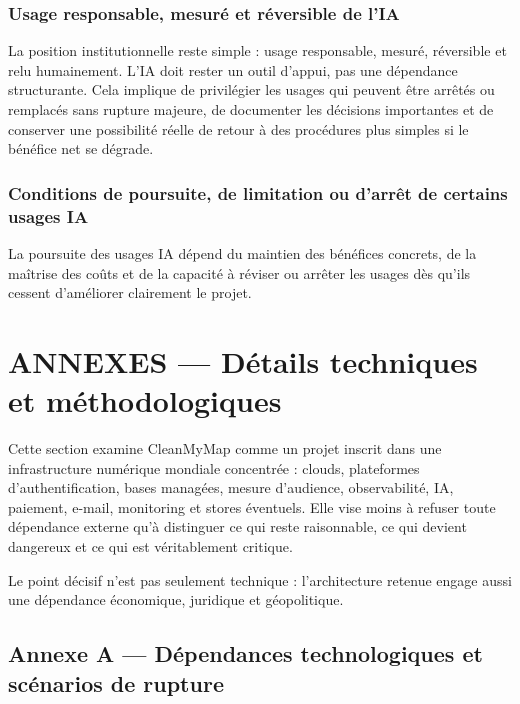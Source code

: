 \documentclass[
  10pt,
  a4paper,
  DIV=11,
  numbers=noendperiod,
  oneside]{scrreprt}
\begin{document}
\subsection{Usage responsable, mesuré et réversible de
l'IA}\label{usage-responsable-mesuruxe9-et-ruxe9versible-de-lia}

La position institutionnelle reste simple : usage responsable, mesuré,
réversible et relu humainement. L'IA doit rester un outil d'appui, pas
une dépendance structurante. Cela implique de privilégier les usages qui
peuvent être arrêtés ou remplacés sans rupture majeure, de documenter
les décisions importantes et de conserver une possibilité réelle de
retour à des procédures plus simples si le bénéfice net se dégrade.

\subsection{Conditions de poursuite, de limitation ou d'arrêt de
certains usages
IA}\label{conditions-de-poursuite-de-limitation-ou-darruxeat-de-certains-usages-ia}

La poursuite des usages IA dépend du maintien des bénéfices concrets, de
la maîtrise des coûts et de la capacité à réviser ou arrêter les usages
dès qu'ils cessent d'améliorer clairement le projet.

\newpage{}

\chapter*{ANNEXES --- Détails techniques et
méthodologiques}\label{annexes}

Cette section examine CleanMyMap comme un projet inscrit dans une
infrastructure numérique mondiale concentrée : clouds, plateformes
d'authentification, bases managées, mesure d'audience, observabilité,
IA, paiement, e-mail, monitoring et stores éventuels. Elle vise moins à
refuser toute dépendance externe qu'à distinguer ce qui reste
raisonnable, ce qui devient dangereux et ce qui est véritablement
critique.

Le point décisif n'est pas seulement technique : l'architecture retenue
engage aussi une dépendance économique, juridique et géopolitique.

\section{Annexe A --- Dépendances technologiques et scénarios de
rupture}\label{annexe-a-dependances-technologiques-et-scenarios-de-rupture}
\end{document}
